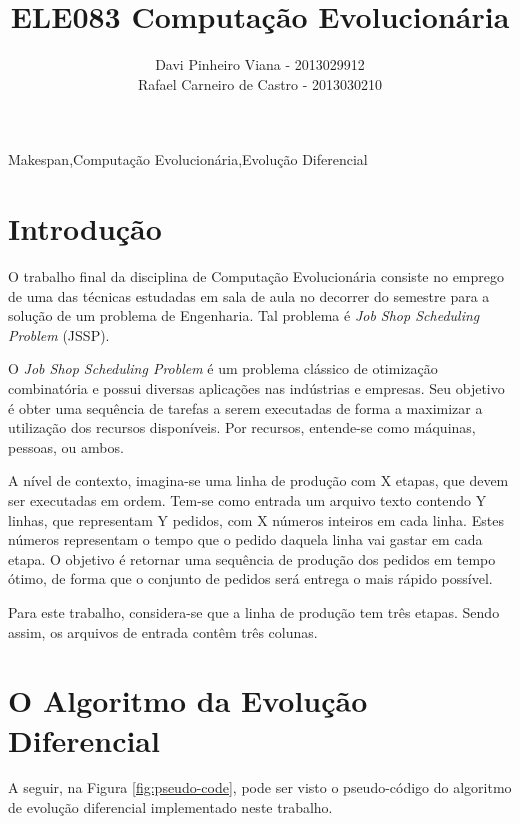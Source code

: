 \documentclass[12pt]{elsarticle}
\begin{document}
	\begin{frontmatter}

		\title{ELE083 Computação Evolucionária\\ }
		\author{Davi Pinheiro Viana - 2013029912\\Rafael Carneiro de Castro - 2013030210}
		\address{Minas Gerais, Brasil}
		
		\begin{keyword}
			Makespan\sep Computação Evolucionária\sep Evolução Diferencial
		\end{keyword}
	\end{frontmatter}
	
	\section{Introdução}
	O trabalho final da disciplina de Computação Evolucionária consiste no emprego de uma das técnicas estudadas em sala de aula no decorrer do semestre para a solução de um problema de Engenharia. Tal problema é \textit{Job Shop Scheduling Problem} (JSSP).
	
	O \textit{Job Shop Scheduling Problem} é um problema clássico de otimização combinatória e possui diversas aplicações nas indústrias e empresas. Seu objetivo é obter uma sequência de tarefas a serem executadas de forma a maximizar a utilização dos recursos disponíveis. Por recursos, entende-se como máquinas, pessoas, ou ambos.
	
	A nível de contexto, imagina-se uma linha de produção com X etapas, que devem ser executadas em ordem. Tem-se como entrada um arquivo texto contendo Y linhas, que representam Y pedidos, com X números inteiros em cada linha. Estes números representam o tempo que o pedido daquela linha vai gastar em cada etapa. O objetivo é retornar uma sequência de produção dos pedidos em tempo ótimo, de forma que o conjunto de pedidos será entrega o mais rápido possível.
	
	Para este trabalho, considera-se que a linha de produção tem três etapas. Sendo assim, os arquivos de entrada contêm três colunas.

	\section{O Algoritmo da Evolução Diferencial}
	A seguir, na Figura \ref{fig:pseudo-code}, pode ser visto o pseudo-código do algoritmo de evolução diferencial implementado neste trabalho.
	
\end{document}
